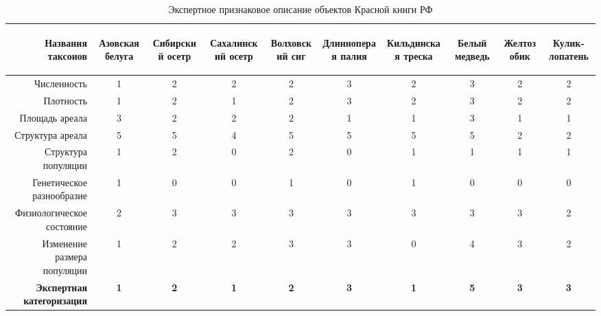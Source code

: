 \documentclass{elsarticle}
\begin{document}
\begin{table}
\caption{Экспертное признаковое описание объектов Красной книги РФ}
\label{Table:IUCN}
\begin{center}
\begin{tabular}{|r|c|c|c|c|c|c|c|c|c|}
\hline
\begin{sideways}Названия таксонов\end{sideways} & \begin{sideways}Азовская белуга\end{sideways} &\begin{sideways}Сибирский осетр\end{sideways}
&\begin{sideways}Сахалинский осетр\end{sideways} &\begin{sideways}Волховский сиг\end{sideways}
&\begin{sideways}Длинноперая палия\end{sideways} &\begin{sideways}Кильдинская треска\end{sideways}
&\begin{sideways}Белый медведь\end{sideways} &\begin{sideways}Желтозобик\end{sideways} &\begin{sideways}Кулик-лопатень\end{sideways}\\
\hline
Численность & 1 & 2 & 2 & 2 & 3 & 2 & 3 & 2 & 2 \\
\hline
Плотность & 1 & 2 & 1 & 2 & 3 & 2 & 3 & 2 & 2 \\
\hline
Площадь ареала & 3 & 2 & 2 & 2 & 1 & 1 & 3 & 1 & 1 \\
\hline
Структура ареала & 5 & 5 & 4 & 5 & 5 & 5 & 5 & 2 & 2 \\
\hline
Структура популяции & 1 & 2 & 0 & 2 & 0 & 1 & 1 & 1 & 1 \\
\hline
Генетическое разнообразие & 1 & 0 & 0 & 1 & 0 & 1 & 0 & 0 & 0 \\
\hline
Физиологическое состояние & 2 & 3 & 3 & 3 & 3 & 3 & 3 & 3 & 2 \\
\hline
Изменение размера популяции & 1 & 2 & 2 & 3 & 3 & 0 & 4 & 3 & 2 \\
\hline
\textbf{Экспертная категоризация} & \textbf{1} & \textbf{2} & \textbf{1} & \textbf{2} & \textbf{3} & \textbf{1} & \textbf{5} & \textbf{3} & \textbf{3} \\
\hline
\end{tabular}
\end{center}
\end{table}
\end{document}
